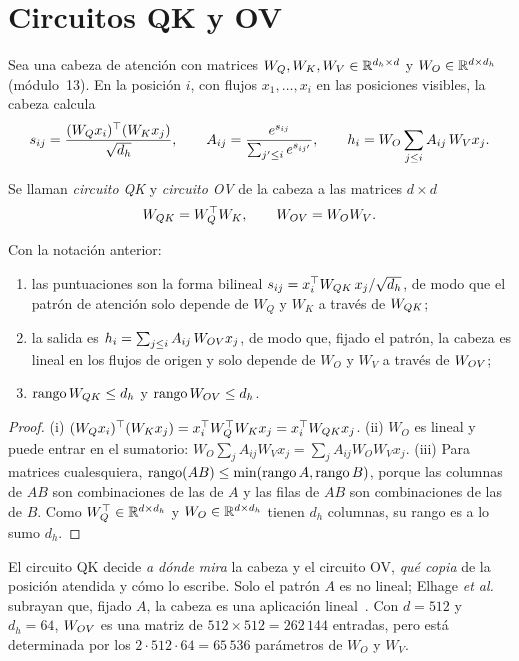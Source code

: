 \section{Circuitos QK y OV}

Sea una cabeza de atención con matrices $W_Q,W_K,W_V\in\mathbb{R}^{d_h\times d}$ y $W_O\in\mathbb{R}^{d\times d_h}$ (módulo~13). En la posición $i$, con flujos $x_1,\dots,x_i$ en las posiciones visibles, la cabeza calcula
\[
s_{ij}=\frac{(W_Qx_i)^{\top}(W_Kx_j)}{\sqrt{d_h}},\qquad A_{ij}=\frac{e^{s_{ij}}}{\sum_{j'\le i}e^{s_{ij'}}},\qquad h_i=W_O\sum_{j\le i}A_{ij}\,W_Vx_j.
\]

\begin{definicion}[Circuitos QK y OV]\label{def:qkov}
Se llaman \emph{circuito QK} y \emph{circuito OV} de la cabeza a las matrices $d\times d$
\[
W_{QK}=W_Q^{\top} W_K,\qquad W_{OV}=W_OW_V.
\]
\end{definicion}

\begin{proposicion}\label{prop:qkov}
Con la notación anterior:
\begin{enumerate}
  \item las puntuaciones son la forma bilineal $s_{ij}=x_i^{\top}W_{QK}\,x_j/\sqrt{d_h}$, de modo que el patrón de atención solo depende de $W_Q$ y $W_K$ a través de $W_{QK}$;
  \item la salida es $h_i=\sum_{j\le i}A_{ij}\,W_{OV} x_j$, de modo que, fijado el patrón, la cabeza es lineal en los flujos de origen y solo depende de $W_O$ y $W_V$ a través de $W_{OV}$;
  \item $\operatorname{rango}W_{QK}\le d_h$ y $\operatorname{rango}W_{OV}\le d_h$.
\end{enumerate}
\end{proposicion}

\begin{proof}
(i) $(W_Qx_i)^{\top}(W_Kx_j)=x_i^{\top} W_Q^{\top} W_Kx_j=x_i^{\top}W_{QK} x_j$. (ii) $W_O$ es lineal y puede entrar en el sumatorio: $W_O\sum_jA_{ij}W_Vx_j=\sum_jA_{ij}W_OW_Vx_j$. (iii) Para matrices cualesquiera, $\operatorname{rango}(AB)\le\min(\operatorname{rango} A,\operatorname{rango} B)$, porque las columnas de $AB$ son combinaciones de las de $A$ y las filas de $AB$ son combinaciones de las de $B$. Como $W_Q^{\top}\in\mathbb{R}^{d\times d_h}$ y $W_O\in\mathbb{R}^{d\times d_h}$ tienen $d_h$ columnas, su rango es a lo sumo $d_h$.
\end{proof}

El circuito QK decide \emph{a dónde mira} la cabeza y el circuito OV, \emph{qué copia} de la posición atendida y cómo lo escribe. Solo el patrón $A$ es no lineal; Elhage \emph{et al.} subrayan que, fijado $A$, la cabeza es una aplicación lineal~\cite[«Splitting Attention Head terms into Query-Key and Output-Value Circuits»]{elhage21}. Con $d=512$ y $d_h=64$, $W_{OV}$ es una matriz de $512\times 512=262\,144$ entradas, pero está determinada por los $2\cdot 512\cdot 64=65\,536$ parámetros de $W_O$ y $W_V$.

